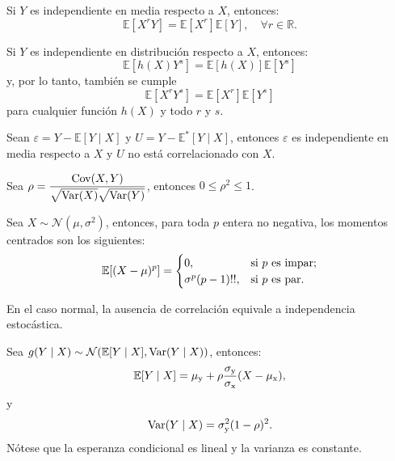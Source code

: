 \documentclass[8pt,a4paper]{extarticle}
\begin{document}
\begin{multicols}{3}
	\begin{boxprop}[]
		Si $Y$ es independiente en media respecto a $X$, entonces:
		\[
			\mathbb{E}[X^r Y] = \mathbb{E}[X^r] \mathbb{E}[Y], \quad \forall r\in \mathbb{R}
			.\]
	\end{boxprop}

	\begin{boxprop}[]
		Si $Y$ es independiente en distribución respecto a $X$, entonces:
		\[
			\mathbb{E}[h(X) Y^s] = \mathbb{E}[h(X)] \mathbb{E}[Y^s]
		\]
		y, por lo tanto, también se cumple
		\[
			\mathbb{E}[X^r Y^s] = \mathbb{E}[X^r] \mathbb{E}[Y^s]
		\]
		para cualquier función $h(X)$ y todo $r$ y $s$.
	\end{boxprop}

	\begin{boxprop}
		Sean $\varepsilon = Y - \mathbb{E} [Y \mid X]$ y $U = Y - \mathbb{E}^* [Y \mid X]$, entonces $\varepsilon$ es independiente en media respecto a $X$ y $U$ no está correlacionado con $X$.
	\end{boxprop}

	\newpage

	\begin{boxtheo}
		Sea $\displaystyle \rho = \frac{\text{\normalfont Cov}(X,Y)}{\sqrt{\text{\normalfont Var}(X)} \sqrt{\text{\normalfont Var}(Y)}}$, entonces $0 \leq \rho^{2} \leq 1$.
	\end{boxtheo}

	\begin{boxprop}
		Sea $X \sim \mathcal{N} (\mu,\sigma^{2})$, entonces, para toda $p$ entera no negativa, los momentos centrados son los siguientes:
		\[\mathbb{E} [(X - \mu)^{p}] =
		\begin{cases}
			0, & \text{si $p$ es impar}; \\
			\sigma^{p}(p-1)!!, & \text{si $p$ es par.}
		\end{cases} \]
	\end{boxprop}

	\begin{boxprop}
		En el caso normal, la ausencia de correlación equivale a independencia estocástica.
	\end{boxprop}

	\begin{boxprop}
		Sea $g(Y \mid X) \sim \mathcal{N}(\mathbb{E}[Y \mid X], \text{\normalfont Var}(Y \mid X))$, entonces:
		\[\mathbb{E} [Y \mid X] = \mu_{\mathrm{y}} + \rho \frac{\sigma_{\mathrm{y}}}{\sigma_{\mathrm{x}}} (X - \mu_{\mathrm{x}}),\]
		y
		\[\text{\normalfont Var}(Y \mid X) = \sigma_{\mathrm{y}}^{2} (1 - \rho)^2.\]
		Nótese que la esperanza condicional es lineal y la varianza es constante.
	\end{boxprop}


\end{multicols}
\end{document}
